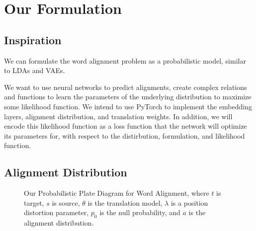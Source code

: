 \documentclass[twoside,twocolumn]{article}
\begin{document}
\section{Our Formulation}

\subsection{Inspiration}
We can formulate the word alignment problem as a probabilistic model, similar to LDAs and VAEs.

We want to use neural networks to predict alignments, create complex relations and functions to learn the parameters of the underlying distribution to maximize some likelihood function. We intend to use PyTorch to implement the embedding layers, alignment distribution, and translation weights. In addition, we will encode this likelihood function as a loss function that the network will optimize its parameters for, with respect to the distirbution, formulation, and likelihood function.

\subsection{Alignment Distribution}

\begin{figure}
\centering
{}
\caption{Our Probabilistic Plate Diagram for Word Alignment, where $t$ is target, $s$ is source, $\theta$ is the translation model, $\lambda$ is a position distortion parameter, $p_0$ is the null probability, and $a$ is the alignment distribution.}
\end{figure}
\end{document}
